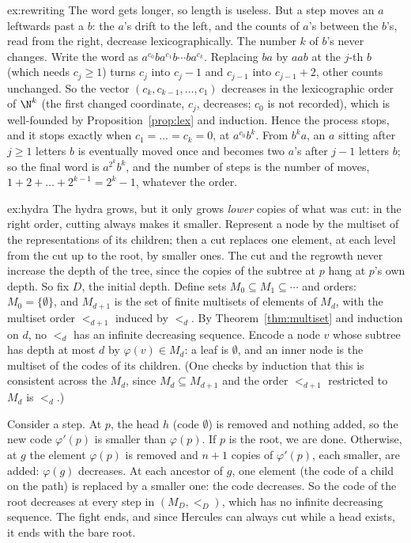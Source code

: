 \begin{solution}{ex:rewriting}
\idea The word gets longer, so length is useless. But a step moves an $a$ leftwards past a $b$: the $a$'s drift to the left,
and the counts of $a$'s between the $b$'s, read from the right, decrease lexicographically.
\writeup The number $k$ of $b$'s never changes. Write the word as $a^{c_0}ba^{c_1}b\cdots ba^{c_k}$. Replacing $ba$ by $aab$ at the $j$-th $b$ (which needs
$c_j\ge1$) turns $c_j$ into $c_j-1$ and $c_{j-1}$ into $c_{j-1}+2$, other counts unchanged. So the vector $(c_k,c_{k-1},\dots,c_1)$ decreases in the
lexicographic order of $\N^k$ (the first changed coordinate, $c_j$, decreases; $c_0$ is not recorded), which is well-founded by
Proposition~\ref{prop:lex} and induction. Hence the process stops, and it stops exactly when $c_1=\dots=c_k=0$, at $a^{c_0}b^k$.
From $b^ka$, an $a$ sitting after $j\ge1$ letters $b$ is eventually moved once and becomes two $a$'s after $j-1$ letters $b$; so the
final word is $a^{2^k}b^k$, and the number of steps is the number of moves, $1+2+\dots+2^{k-1}=2^k-1$, whatever the order.
\end{solution}

\begin{solution}{ex:hydra}
\idea The hydra grows, but it only grows \emph{lower} copies of what was cut: in the right order, cutting always makes it
smaller. Represent a node by the multiset of the representations of its children; then a cut replaces one element, at each
level from the cut up to the root, by smaller ones.
\writeup The cut and the regrowth never increase the depth of the tree, since the copies of the subtree at $p$ hang at $p$'s own
depth. So fix $D$, the initial depth. Define sets $M_0\subseteq M_1\subseteq\cdots$ and orders: $M_0=\{\emptyset\}$, and $M_{d+1}$ is the set of finite multisets of
elements of $M_d$, with the multiset order $<_{d+1}$ induced by $<_d$. By Theorem~\ref{thm:multiset} and induction on $d$, no $<_d$ has an
infinite decreasing sequence. Encode a node $v$ whose subtree has depth at most $d$ by $\varphi(v)\in M_d$: a leaf is $\emptyset$, and an
inner node is the multiset of the codes of its children. (One checks by induction that this is consistent across the
$M_d$, since $M_d\subseteq M_{d+1}$ and the order $<_{d+1}$ restricted to $M_d$ is $<_d$.)

Consider a step. At $p$, the head $h$ (code $\emptyset$) is removed and nothing added, so the new code $\varphi'(p)$ is smaller than $\varphi(p)$. If $p$ is the
root, we are done. Otherwise, at $g$ the element $\varphi(p)$ is removed and $n+1$ copies of $\varphi'(p)$, each smaller, are added: $\varphi(g)$
decreases. At each ancestor of $g$, one element (the code of a child on the path) is replaced by a smaller one: the code
decreases. So the code of the root decreases at every step in $(M_D,<_D)$, which has no infinite decreasing sequence. The
fight ends, and since Hercules can always cut while a head exists, it ends with the bare root.
\end{solution}

